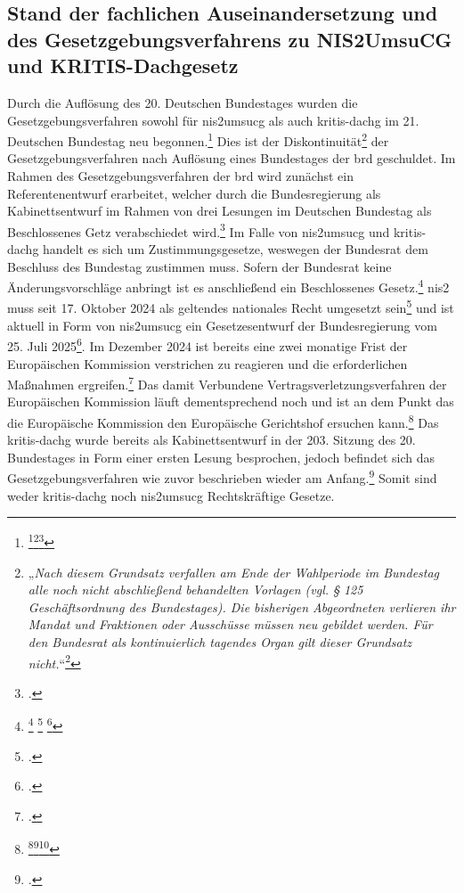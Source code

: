 \documentclass[11pt,a4paper,hidelinks]{article}   %
\begin{document}
        \subsection{Stand der fachlichen Auseinandersetzung und des Gesetzgebungsverfahrens zu NIS2UmsuCG und KRITIS-Dachgesetz}\label{subsec:AktuellerForschungsstand}
        Durch die Auflösung des 20. Deutschen Bundestages wurden die Gesetzgebungsverfahren sowohl für \gls{nis2umsucg} als auch \gls{kritis-dachg} im 21. Deutschen Bundestag neu begonnen.\footnote{\footcite[Vgl. §125,][]{BTGO}\footcite[Vgl. S. 1][]{brd:c54cf9}\footcite[Vgl. S. 52][]{brd:4a7cbe}} Dies ist der Diskontinuität\footnote{„\emph{Nach diesem Grundsatz verfallen am Ende der Wahlperiode im Bundestag alle noch nicht abschließend behandelten Vorlagen (vgl. § 125 Geschäftsordnung des Bundestages). Die bisherigen Abgeordneten verlieren ihr Mandat und Fraktionen oder Ausschüsse müssen neu gebildet werden. Für den Bundesrat als kontinuierlich tagendes Organ gilt dieser Grundsatz nicht.}“\footcite[Vgl. S. 1,][]{brd:33503f}} der Gesetzgebungsverfahren nach Auflösung eines Bundestages der \gls{brd} geschuldet. Im Rahmen des Gesetzgebungsverfahren der \gls{brd} wird zunächst ein Referentenentwurf erarbeitet, welcher durch die Bundesregierung als Kabinettsentwurf im Rahmen von drei Lesungen im Deutschen Bundestag als Beschlossenes Getz verabschiedet wird.\footcite[Vgl. S. 1][]{bmi:a4771a} Im Falle von \gls{nis2umsucg} und \gls{kritis-dachg} handelt es sich um Zustimmungsgesetze, weswegen der Bundesrat dem Beschluss des Bundestag zustimmen muss. Sofern der Bundesrat keine Änderungsvorschläge anbringt ist es anschließend ein Beschlossenes Gesetz.\footnote{
            \footcite[Vgl. Artikel 104a, Absatz 4,][]{GG}
            \footcite[Vgl. Artikel 84, Absatz 1 GG,][]{GG}
            \footcite[Vgl. S. 1][]{bmi:a4771a}
        }\medbreak
        \gls{nis2} muss seit 17. Oktober 2024 als geltendes nationales Recht umgesetzt sein\footcite[Vgl. Artikel 21, Absatz 5,][]{EU2022-2555} und ist aktuell in Form von \gls{nis2umsucg} ein Gesetzesentwurf der Bundesregierung vom 25. Juli 2025\footcite[Vgl. S. 2,][]{bmi:98905b}. Im Dezember 2024 ist bereits eine zwei monatige Frist der Europäischen Kommission verstrichen zu reagieren und die erforderlichen Maßnahmen ergreifen.\footcite[Vgl. S. 15,][]{eu:9274cb} Das damit Verbundene Vertragsverletzungsverfahren der Europäischen Kommission läuft dementsprechend noch und ist an dem Punkt das die Europäische Kommission den Europäische Gerichtshof ersuchen kann.\footnote{\footcite[Vgl. S. 2,][]{eu:4a7cbe}\footcite[Vgl. S. 2,][]{eu:376b82}\footcite[Vgl. S. 15,][]{eu:9274cb}} Das \gls{kritis-dachg} wurde bereits als Kabinettsentwurf in der 203. Sitzung des 20. Bundestages in Form einer ersten Lesung besprochen, jedoch befindet sich das Gesetzgebungsverfahren wie zuvor beschrieben wieder am Anfang.\footcite[Vgl. S. 26270 - 26280][]{brd:8c35b7} Somit sind weder \gls{kritis-dachg} noch \gls{nis2umsucg} Rechtskräftige Gesetze.\medbreak
\end{document}
